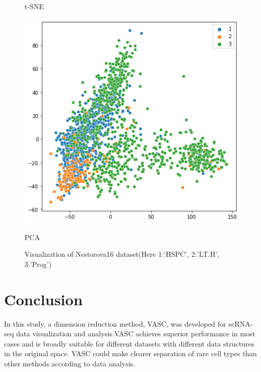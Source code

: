 \documentclass[12 pts]{article}
\begin{document}
\begin{figure}[H]
\begin{minipage}[h]{0.3\textwidth}
\caption*{t-SNE}
\label{fig:t-SNE}
\end{minipage}
\begin{minipage}[h]{0.3\textwidth}
\includegraphics[width=\linewidth]{PCA}
\caption*{PCA}
\end{minipage}
\caption{Visualization of Nestorova16 dataset(Here 1:'HSPC', 2:'LT.H', 3:'Prog')} 
\end{figure}





\section{Conclusion}
In this study, a dimension reduction method, VASC, was developed for scRNA-seq data visualization and analysis.VASC achieves superior performance in most cases and is broadly suitable for different datasets with different data structures in the original space. VASC could make clearer separation of rare cell types than other methods according to data analysis. 
\end{document}
